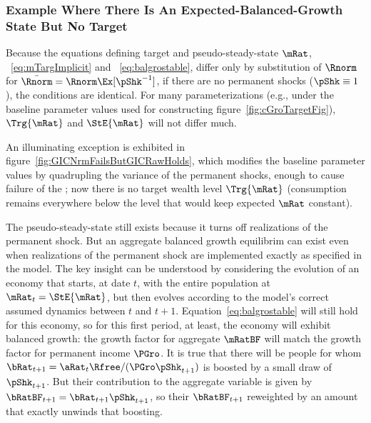 \documentclass[BufferStockTheory]{subfiles}
\begin{document}

\subsubsection{Example Where There Is An Expected-Balanced-Growth State But No Target}

Because the equations defining target and pseudo-steady-state $\mRat$, ~\eqref{eq:mTargImplicit} and ~\eqref{eq:balgrostable}, differ only by substitution of $\Rnorm$ for $\bar{\Rnorm}=\Rnorm \Ex[\pShk^{-1}]$, if there are no permanent shocks ($\pShk \equiv 1$), the conditions are identical.  For many parameterizations (e.g., under the baseline parameter values used for constructing figure~\ref{fig:cGroTargetFig}), $\Trg{\mRat}$ and $\StE{\mRat}$ will not differ much.

An illuminating exception is exhibited in figure~\ref{fig:GICNrmFailsButGICRawHolds}, which modifies the baseline parameter values by quadrupling the variance of the permanent shocks, enough to cause failure of the \GICNrm; now there is no target wealth level $\Trg{\mRat}$ (consumption remains everywhere below the level that would keep expected $\mRat$ constant).  


\renewcommand{\figFile}{GICNrmFailsButGICRawHolds}
\hypertarget{\figFile}{}


The pseudo-steady-state still exists because it turns off realizations of the permanent shock.  But an aggregate balanced growth equilibrim can exist even when realizations of the permanent shock are implemented exactly as specified in the model.  The key insight can be understood by considering the evolution of an economy that starts, at date $t$, with the entire population at $\mRat_{t}=\StE{\mRat}$, but then evolves according to the model's correct assumed dynamics between $t$ and $t+1$.  Equation~\eqref{eq:balgrostable} will still hold for this economy, so for this first period, at least, the economy will exhibit balanced growth: the growth factor for aggregate $\mRatBF$ will match the growth factor for permanent income $\PGro$.  It is true that there will be people for whom $\bRat_{t+1}=\aRat_{t}\Rfree/(\PGro\pShk_{t+1})$ is boosted by a small draw of $\pShk_{t+1}$.  But their contribution to the aggregate variable is given by $\bRatBF_{t+1}=\bRat_{t+1}\pShk_{t+1}$, so their $\bRatBF_{t+1}$ reweighted by an amount that exactly unwinds that boosting.
\end{document}
